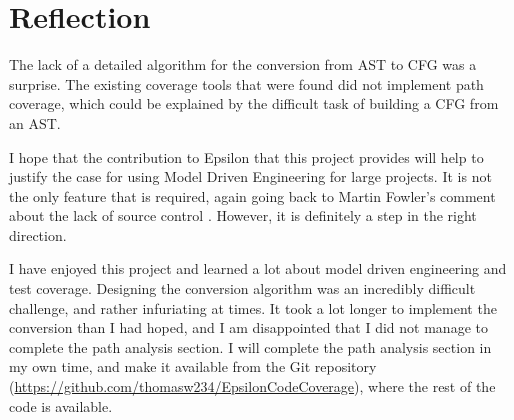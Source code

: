 \section{Reflection}

The lack of a detailed algorithm for the conversion from AST to CFG was a surprise. The existing coverage tools that were found did not implement path coverage, which could be explained by the difficult task of building a CFG from an AST.

I hope that the contribution to Epsilon that this project provides will help to justify the case for using Model Driven Engineering for large projects. It is not the only feature that is required, again going back to Martin Fowler's comment about the lack of source control \cite{fowlerMDE}. However, it is definitely a step in the right direction.

I have enjoyed this project and learned a lot about model driven engineering and test coverage. Designing the conversion algorithm was an incredibly difficult challenge, and rather infuriating at times. It took a lot longer to implement the conversion than I had hoped, and I am disappointed that I did not manage to complete the path analysis section. I will complete the path analysis section in my own time, and make it available from the Git repository (\url{https://github.com/thomasw234/EpsilonCodeCoverage}), where the rest of the code is available.